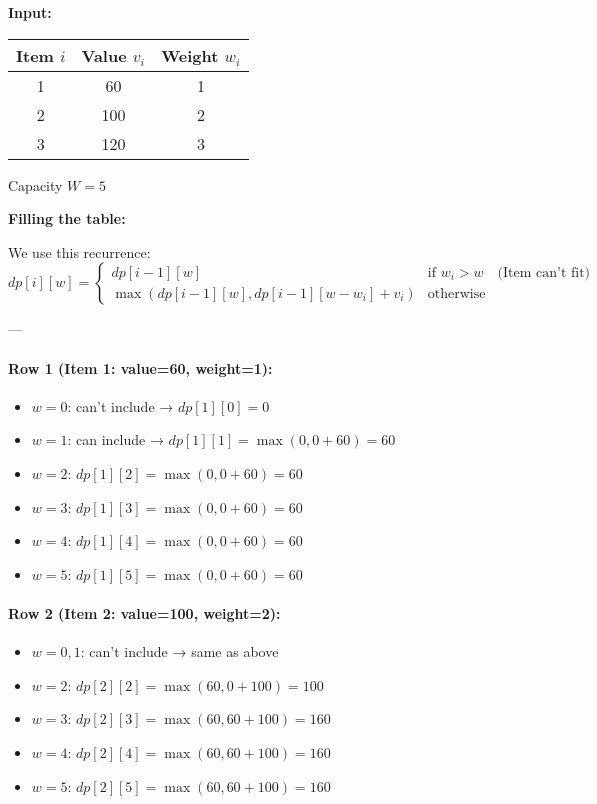 \documentclass[14pt]{extarticle}
\begin{document}
\textbf{Input:}

\begin{tabular}{|c|c|c|}
\hline
Item $i$ & Value $v_i$ & Weight $w_i$ \\
\hline
1 & 60 & 1 \\
2 & 100 & 2 \\
3 & 120 & 3 \\
\hline
\end{tabular}
\quad \quad
Capacity $W = 5$

\bigskip

\textbf{Filling the table:}

We use this recurrence:
\[
dp[i][w] =
\begin{cases}
    dp[i-1][w] & \text{if } w_i > w \quad \text{(Item can't fit)} \\
    \max(dp[i-1][w], dp[i-1][w - w_i] + v_i) & \text{otherwise}
\end{cases}
\]

---

\paragraph{Row 1 (Item 1: value=60, weight=1):}

\begin{itemize}
    \item $w = 0$: can't include → $dp[1][0] = 0$
    \item $w = 1$: can include → $dp[1][1] = \max(0, 0 + 60) = 60$
    \item $w = 2$: $dp[1][2] = \max(0, 0 + 60) = 60$
    \item $w = 3$: $dp[1][3] = \max(0, 0 + 60) = 60$
    \item $w = 4$: $dp[1][4] = \max(0, 0 + 60) = 60$
    \item $w = 5$: $dp[1][5] = \max(0, 0 + 60) = 60$
\end{itemize}

\paragraph{Row 2 (Item 2: value=100, weight=2):}

\begin{itemize}
    \item $w = 0,1$: can't include → same as above
    \item $w = 2$: $dp[2][2] = \max(60, 0 + 100) = 100$
    \item $w = 3$: $dp[2][3] = \max(60, 60 + 100) = 160$
    \item $w = 4$: $dp[2][4] = \max(60, 60 + 100) = 160$
    \item $w = 5$: $dp[2][5] = \max(60, 60 + 100) = 160$
\end{itemize}
\end{document}
